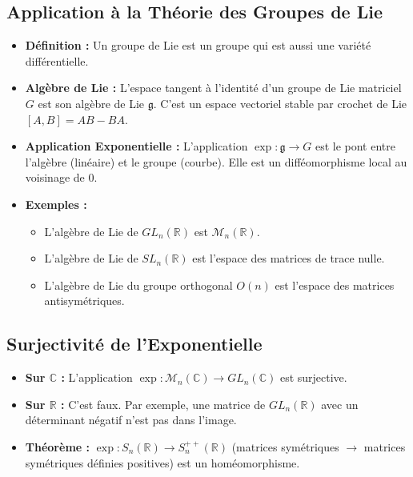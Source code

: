 \documentclass[12pt, a4paper, parskip=full]{report}
\theoremstyle{agregstyle}
\begin{document}
\subsection{Application à la Théorie des Groupes de Lie}
\begin{itemize}
    \item \textbf{Définition :} Un groupe de Lie est un groupe qui est aussi une variété différentielle.
    \item \textbf{Algèbre de Lie :} L'espace tangent à l'identité d'un groupe de Lie matriciel $G$ est son algèbre de Lie $\mathfrak{g}$. C'est un espace vectoriel stable par crochet de Lie $[A,B]=AB-BA$.
    \item \textbf{Application Exponentielle :} L'application $\exp: \mathfrak{g} \to G$ est le pont entre l'algèbre (linéaire) et le groupe (courbe). Elle est un difféomorphisme local au voisinage de 0.
    \item \textbf{Exemples :}
        \begin{itemize}
            \item L'algèbre de Lie de $GL_n(\mathbb{R})$ est $\mathcal{M}_n(\mathbb{R})$.
            \item L'algèbre de Lie de $SL_n(\mathbb{R})$ est l'espace des matrices de trace nulle.
            \item L'algèbre de Lie du groupe orthogonal $O(n)$ est l'espace des matrices antisymétriques.
        \end{itemize}
\end{itemize}
\subsection{Surjectivité de l'Exponentielle}
\begin{itemize}
    \item \textbf{Sur $\mathbb{C}$ :} L'application $\exp: \mathcal{M}_n(\mathbb{C}) \to GL_n(\mathbb{C})$ est surjective.
    \item \textbf{Sur $\mathbb{R}$ :} C'est faux. Par exemple, une matrice de $GL_n(\mathbb{R})$ avec un déterminant négatif n'est pas dans l'image.
    \item \textbf{Théorème :} $\exp: S_n(\mathbb{R}) \to S_n^{++}(\mathbb{R})$ (matrices symétriques $\to$ matrices symétriques définies positives) est un homéomorphisme.
\end{itemize}
\end{document}
